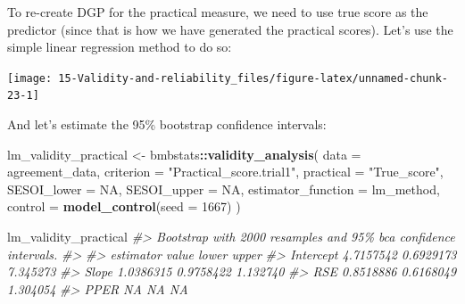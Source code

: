 \documentclass[
]{book}
\newenvironment{Shaded}{\begin{snugshade}}{\end{snugshade}}
\newcommand{\CommentTok}[1]{\textcolor[rgb]{0.56,0.35,0.01}{\textit{#1}}}
\newcommand{\DataTypeTok}[1]{\textcolor[rgb]{0.13,0.29,0.53}{#1}}
\newcommand{\DecValTok}[1]{\textcolor[rgb]{0.00,0.00,0.81}{#1}}
\newcommand{\KeywordTok}[1]{\textcolor[rgb]{0.13,0.29,0.53}{\textbf{#1}}}
\newcommand{\NormalTok}[1]{#1}
\newcommand{\OperatorTok}[1]{\textcolor[rgb]{0.81,0.36,0.00}{\textbf{#1}}}
\newcommand{\OtherTok}[1]{\textcolor[rgb]{0.56,0.35,0.01}{#1}}
\newcommand{\StringTok}[1]{\textcolor[rgb]{0.31,0.60,0.02}{#1}}
\begin{document}
To re-create DGP for the practical measure, we need to use true score as the predictor (since that is how we have generated the practical scores). Let's use the simple linear regression method to do so:

\begin{Shaded}
\end{Shaded}

\begin{center}\texttt{[image: 15-Validity-and-reliability\_files/figure-latex/unnamed-chunk-23-1]} \end{center}

And let's estimate the 95\% bootstrap confidence intervals:

\begin{Shaded}
\begin{Highlighting}[]
\NormalTok{lm\_validity\_practical <{-}}\StringTok{ }\NormalTok{bmbstats}\OperatorTok{::}\KeywordTok{validity\_analysis}\NormalTok{(}
  \DataTypeTok{data =}\NormalTok{ agreement\_data,}
  \DataTypeTok{criterion =} \StringTok{"Practical\_score.trial1"}\NormalTok{,}
  \DataTypeTok{practical =} \StringTok{"True\_score"}\NormalTok{,}
  \DataTypeTok{SESOI\_lower =} \OtherTok{NA}\NormalTok{,}
  \DataTypeTok{SESOI\_upper =} \OtherTok{NA}\NormalTok{,}
  \DataTypeTok{estimator\_function =}\NormalTok{ lm\_method,}
  \DataTypeTok{control =} \KeywordTok{model\_control}\NormalTok{(}\DataTypeTok{seed =} \DecValTok{1667}\NormalTok{)}
\NormalTok{)}

\NormalTok{lm\_validity\_practical}
\CommentTok{\#> Bootstrap with 2000 resamples and 95\% bca confidence intervals.}
\CommentTok{\#> }
\CommentTok{\#>  estimator     value     lower    upper}
\CommentTok{\#>  Intercept 4.7157542 0.6929173 7.345273}
\CommentTok{\#>      Slope 1.0386315 0.9758422 1.132740}
\CommentTok{\#>        RSE 0.8518886 0.6168049 1.304054}
\CommentTok{\#>       PPER        NA        NA       NA}
\end{Highlighting}
\end{Shaded}
\end{document}

